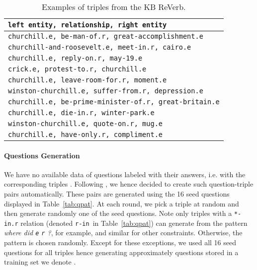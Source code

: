 \documentclass[runningheads,a4paper]{llncs}
\newcommand{\kb}[1]{{\small\texttt{#1}}\xspace}
\newcommand{\rv}{{\sc ReVerb}\xspace}
\begin{document}
\begin{table}[t]
\label{tab:exrv}
\begin{center}
\caption{Examples of triples from the KB \rv.} 
\begin{small}
\begin{tabular}{|l|}
\hline
\multicolumn{1}{|l|}{ {\bf \kb{left entity, relationship, right entity}  }}\\
\hline
\kb{churchill.e, be-man-of.r, great-accomplishment.e}\\
\kb{churchill-and-roosevelt.e, meet-in.r, cairo.e}\\
\kb{churchill.e, reply-on.r, may-19.e}\\
\kb{crick.e, protest-to.r, churchill.e}\\
\kb{churchill.e, leave-room-for.r, moment.e}\\
\kb{winston-churchill.e, suffer-from.r, depression.e}\\
\kb{churchill.e, be-prime-minister-of.r, great-britain.e}\\
\kb{churchill.e, die-in.r, winter-park.e}\\
\kb{winston-churchill.e, quote-on.r, mug.e}\\
\kb{churchill.e, have-only.r, compliment.e}\\
\hline
\end{tabular}
\end{small}
\end{center}
\end{table}


\paragraph{Questions Generation}


We have no available data of questions  labeled with their answers, i.e. with the corresponding triples . Following \cite{paralex}, we hence decided to create such question-triple pairs automatically.
These pairs are generated  using the 16 seed questions displayed in Table~\ref{tab:qpat}. 
At each round, we pick a triple at random and then generate randomly one of the seed questions. Note only triples with a \kb{*-in.r} relation (denoted  \kb{r-in} in Table~\ref{tab:qpat}) can generate from the pattern {\it where did \kb{e} \kb{r} ?}, for example, and similar for other constraints. Otherwise, the pattern is chosen randomly.  
Except for these exceptions, we used all 16 seed questions for all triples hence generating approximately  questions stored in a training set we denote .
\end{document}
